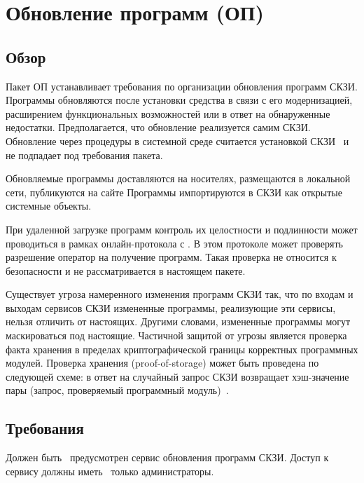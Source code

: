 \section{Обновление программ (ОП)}\label{SU}

\subsection{Обзор}\label{SU.Intro}

Пакет ОП устанавливает требования по организации обновления программ СКЗИ.
Программы обновляются после установки средства в связи с его модернизацией, 
расширением функциональных возможностей или в ответ на обнаруженные недостатки.
%
Предполагается, что обновление реализуется самим СКЗИ. Обновление через 
процедуры в системной среде считается установкой СКЗИ~ 
и не подпадает под требования пакета.

Обновляемые программы доставляются на  носителях,
размещаются в локальной сети, публикуются на сайте 
%
Программы импортируются в СКЗИ как открытые системные объекты.

При удаленной загрузке программ контроль их целостности и подлинности 
может проводиться в рамках онлайн-протокола с . 
В этом протоколе  может проверять разрешение 
оператор на получение программ. Такая проверка не относится к 
безопасности и не рассматривается в настоящем пакете.

Существует угроза намеренного изменения программ СКЗИ так, что по
входам и выходам сервисов СКЗИ измененные программы, реализующие эти сервисы, 
нельзя отличить от настоящих. Другими словами, измененные программы могут 
маскироваться под настоящие. Частичной защитой от угрозы является проверка 
факта хранения в пределах криптографической границы корректных программных 
модулей. Проверка хранения (proof-of-storage) может быть проведена по следующей 
схеме: в ответ на случайный запрос СКЗИ возвращает хэш-значение пары (запрос, 
проверяемый программный модуль)~.

\subsection{Требования}\label{SU.Reqs}

\label{R.SU.Service}
Должен быть~ предусмотрен сервис обновления 
программ СКЗИ. Доступ к сервису должны иметь~ 
только администраторы.


